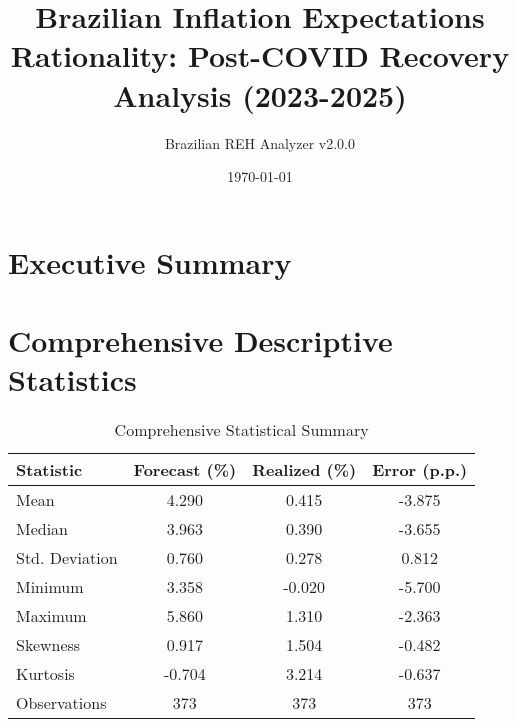 \documentclass[11pt,a4paper]{article}
\title{Brazilian Inflation Expectations Rationality: Post-COVID Recovery Analysis (2023-2025)}
\author{Brazilian REH Analyzer v2.0.0}
\date{\today}
\begin{document}
\maketitle

\section{Executive Summary}

\begin{center}
\end{center}

\section{Comprehensive Descriptive Statistics}

\begin{table}[H]
\centering
\caption{Comprehensive Statistical Summary}
\begin{tabular}{lccc}
\toprule
\textbf{Statistic} & \textbf{Forecast (\%)} & \textbf{Realized (\%)} & \textbf{Error (p.p.)} \\
\midrule
Mean & 4.290 & 0.415 & -3.875 \\
Median & 3.963 & 0.390 & -3.655 \\
Std. Deviation & 0.760 & 0.278 & 0.812 \\
Minimum & 3.358 & -0.020 & -5.700 \\
Maximum & 5.860 & 1.310 & -2.363 \\
Skewness & 0.917 & 1.504 & -0.482 \\
Kurtosis & -0.704 & 3.214 & -0.637 \\
Observations & 373 & 373 & 373 \\
\bottomrule
\end{tabular}
\end{table}
\end{document}
